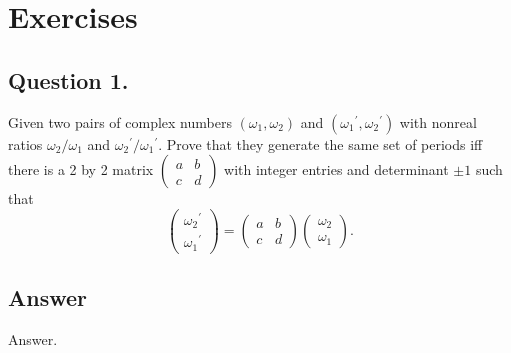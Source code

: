 \section{Exercises}

\subsection*{Question 1.}

\noindent
Given two pairs of complex numbers $(\omega_1, \omega_2)$ and $({\omega_1}^\prime, {\omega_2}^\prime)$ with nonreal
ratios $\omega_2 / \omega_1$ and ${\omega_2}^\prime / {\omega_1}^\prime$. Prove that they generate the same set of
periods iff there is a 2 by 2 matrix $\begin{pmatrix} a & b \\ c & d \end{pmatrix}$ with integer entries and
determinant $\pm 1$ such that \[
\begin{pmatrix} {\omega_2}^\prime \\ {\omega_1}^\prime \end{pmatrix} =
\begin{pmatrix} a & b \\ c & d \end{pmatrix} \begin{pmatrix} \omega_2 \\ \omega_1 \end{pmatrix}.
\]

\subsection*{Answer}

\noindent
Answer.